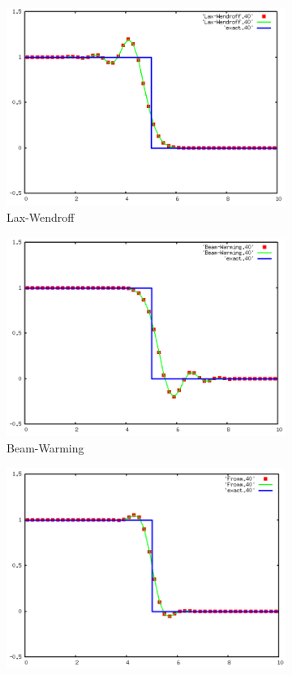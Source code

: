 \documentclass[12pt, a4paper]{article}
\begin{document}
\begin{figure}[H]
\begin{subfigure}[b]{0.48\textwidth}
		\centering
		\includegraphics[width=\textwidth]{python/lax-wen}
		\caption{Lax-Wendroff}
		\label{fig:lax}
	\end{subfigure}
	\hfill
	\begin{subfigure}[b]{0.48\textwidth}
		\centering
		\includegraphics[width=\textwidth]{python/beam-warming}
		\caption{Beam-Warming}
		\label{fig:beam}
	\end{subfigure}
	\hfill
	\begin{subfigure}[b]{0.48\textwidth}
		\centering
		\includegraphics[width=\textwidth]{python/fromm}

\end{subfigure}
\end{figure}
\end{document}
